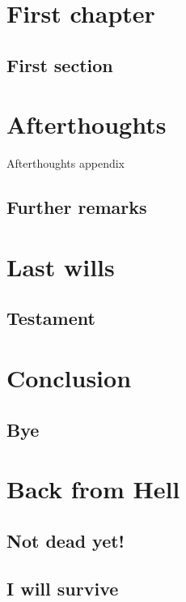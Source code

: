 \documentclass[oneside]{memoir}
\begin{document}
\dominitoc \tableofcontents
\adjustmtc
\chapter{First chapter}
\minitoc
\lipsum[1]
\section{First section}
\lipsum[2]
\begin{appendices}
\addappheadtotoc
\adjustmtc %
\chapter{Afterthoughts}
\minitoc
\lipsum[3]
Afterthoughts appendix
\section{Further remarks}
\lipsum[4]
\chapter{Last wills}
\minitoc
\section{Testament}
\lipsum[5]
\end{appendices}
\chapter{Conclusion}
\minitoc
\section{Bye}
\lipsum[6]
\chapter{Back from Hell}
\minitoc
\section{Not dead yet!}
\lipsum[7]
\section{I will survive}
\lipsum[8]
\end{document}
